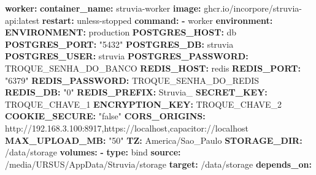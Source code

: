 \documentclass[
  10pt,
]{article}
\newenvironment{Shaded}{\begin{snugshade}}{\end{snugshade}}
\newcommand{\AttributeTok}[1]{\textcolor[rgb]{0.13,0.29,0.53}{#1}}
\newcommand{\FunctionTok}[1]{\textcolor[rgb]{0.13,0.29,0.53}{\textbf{#1}}}
\newcommand{\KeywordTok}[1]{\textcolor[rgb]{0.13,0.29,0.53}{\textbf{#1}}}
\newcommand{\StringTok}[1]{\textcolor[rgb]{0.31,0.60,0.02}{#1}}
\begin{document}
\begin{Shaded}
\begin{Highlighting}[]
\AttributeTok{  }\FunctionTok{worker}\KeywordTok{:}
\AttributeTok{    }\FunctionTok{container\_name}\KeywordTok{:}\AttributeTok{ struvia{-}worker}
\AttributeTok{    }\FunctionTok{image}\KeywordTok{:}\AttributeTok{ ghcr.io/incorpore/struvia{-}api:latest}
\AttributeTok{    }\FunctionTok{restart}\KeywordTok{:}\AttributeTok{ unless{-}stopped}
\AttributeTok{    }\FunctionTok{command}\KeywordTok{:}
\AttributeTok{      }\KeywordTok{{-}}\AttributeTok{ worker}
\AttributeTok{    }\FunctionTok{environment}\KeywordTok{:}
\AttributeTok{      }\FunctionTok{ENVIRONMENT}\KeywordTok{:}\AttributeTok{ production}
\AttributeTok{      }\FunctionTok{POSTGRES\_HOST}\KeywordTok{:}\AttributeTok{ db}
\AttributeTok{      }\FunctionTok{POSTGRES\_PORT}\KeywordTok{:}\AttributeTok{ }\StringTok{"5432"}
\AttributeTok{      }\FunctionTok{POSTGRES\_DB}\KeywordTok{:}\AttributeTok{ struvia}
\AttributeTok{      }\FunctionTok{POSTGRES\_USER}\KeywordTok{:}\AttributeTok{ struvia}
\AttributeTok{      }\FunctionTok{POSTGRES\_PASSWORD}\KeywordTok{:}\AttributeTok{ TROQUE\_SENHA\_DO\_BANCO}
\AttributeTok{      }\FunctionTok{REDIS\_HOST}\KeywordTok{:}\AttributeTok{ redis}
\AttributeTok{      }\FunctionTok{REDIS\_PORT}\KeywordTok{:}\AttributeTok{ }\StringTok{"6379"}
\AttributeTok{      }\FunctionTok{REDIS\_PASSWORD}\KeywordTok{:}\AttributeTok{ TROQUE\_SENHA\_DO\_REDIS}
\AttributeTok{      }\FunctionTok{REDIS\_DB}\KeywordTok{:}\AttributeTok{ }\StringTok{"0"}
\AttributeTok{      }\FunctionTok{REDIS\_PREFIX}\KeywordTok{:}\AttributeTok{ Struvia\_}
\AttributeTok{      }\FunctionTok{SECRET\_KEY}\KeywordTok{:}\AttributeTok{ TROQUE\_CHAVE\_1}
\AttributeTok{      }\FunctionTok{ENCRYPTION\_KEY}\KeywordTok{:}\AttributeTok{ TROQUE\_CHAVE\_2}
\AttributeTok{      }\FunctionTok{COOKIE\_SECURE}\KeywordTok{:}\AttributeTok{ }\StringTok{"false"}
\AttributeTok{      }\FunctionTok{CORS\_ORIGINS}\KeywordTok{:}\AttributeTok{ http://192.168.3.100:8917,https://localhost,capacitor://localhost}
\AttributeTok{      }\FunctionTok{MAX\_UPLOAD\_MB}\KeywordTok{:}\AttributeTok{ }\StringTok{"50"}
\AttributeTok{      }\FunctionTok{TZ}\KeywordTok{:}\AttributeTok{ America/Sao\_Paulo}
\AttributeTok{      }\FunctionTok{STORAGE\_DIR}\KeywordTok{:}\AttributeTok{ /data/storage}
\AttributeTok{    }\FunctionTok{volumes}\KeywordTok{:}
\AttributeTok{      }\KeywordTok{{-}}\AttributeTok{ }\FunctionTok{type}\KeywordTok{:}\AttributeTok{ bind}
\AttributeTok{        }\FunctionTok{source}\KeywordTok{:}\AttributeTok{ /media/URSUS/AppData/Struvia/storage}
\AttributeTok{        }\FunctionTok{target}\KeywordTok{:}\AttributeTok{ /data/storage}
\AttributeTok{    }\FunctionTok{depends\_on}\KeywordTok{:}

\end{Highlighting}
\end{Shaded}
\end{document}
